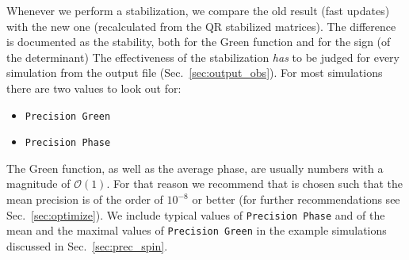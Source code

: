 Whenever we perform a stabilization, we compare the old result (fast updates) with the new one (recalculated from the QR stabilized matrices). The difference is documented as the stability, both for the Green function and for the sign (of the determinant)
The effectiveness of the stabilization \emph{has} to be judged for every simulation from the output file  (Sec.~\ref{sec:output_obs}). For most simulations there are two values to look out for:
\begin{itemize}
\item \texttt{Precision Green} 
\item \texttt{Precision Phase} 
\end{itemize}
The Green function, as well as the average phase, are usually numbers with a magnitude of $\mathcal{O} (1)$. 
For that reason we recommend that   is chosen such that the mean precision is of the order of $10^{-8}$ or better (for further recommendations see Sec.~\ref{sec:optimize}).
We include typical values of \texttt{Precision Phase} and of the mean and the maximal values of \texttt{Precision Green} in the example simulations discussed in Sec.~\ref{sec:prec_spin}.
